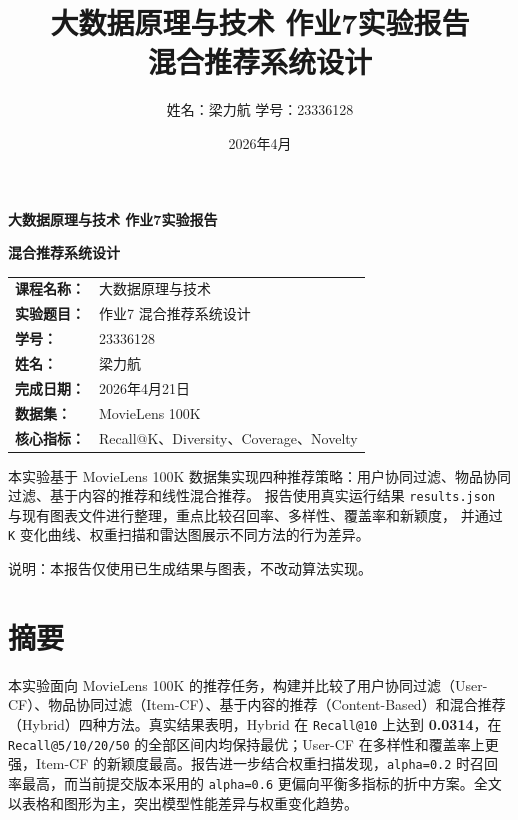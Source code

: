 \documentclass[UTF8,a4paper,12pt,fontset=fandol]{ctexart}
\title{\heiti 大数据原理与技术 作业7实验报告\\混合推荐系统设计}
\author{姓名：梁力航 \quad 学号：23336128}
\date{2026年4月}
\begin{document}
\begin{titlepage}
    \centering
    {\bfseries 大数据原理与技术 作业7实验报告\par}
    \vspace{0.6em}
    {\bfseries 混合推荐系统设计\par}
    \vspace{2.2em}

    \begin{tabularx}{0.92\textwidth}{>{\bfseries}p{4cm}X}
        课程名称： & 大数据原理与技术 \\
        实验题目： & 作业7 混合推荐系统设计 \\
        学号： & 23336128 \\
        姓名： & 梁力航 \\
        完成日期： & 2026年4月21日 \\
        数据集： & MovieLens 100K \\
        核心指标： & Recall@K、Diversity、Coverage、Novelty \\
    \end{tabularx}

    \vspace{1.8em}
    \begin{minipage}{0.92\textwidth}
        \small
        本实验基于 MovieLens 100K 数据集实现四种推荐策略：用户协同过滤、物品协同过滤、基于内容的推荐和线性混合推荐。
        报告使用真实运行结果 \texttt{results.json} 与现有图表文件进行整理，重点比较召回率、多样性、覆盖率和新颖度，
        并通过 \texttt{K} 变化曲线、权重扫描和雷达图展示不同方法的行为差异。
    \end{minipage}

    \vfill
    {\small 说明：本报告仅使用已生成结果与图表，不改动算法实现。}
\end{titlepage}

\section*{摘要}
本实验面向 MovieLens 100K 的推荐任务，构建并比较了用户协同过滤（User-CF）、物品协同过滤（Item-CF）、基于内容的推荐（Content-Based）和混合推荐（Hybrid）四种方法。真实结果表明，Hybrid 在 \texttt{Recall@10} 上达到 \textbf{0.0314}，在 \texttt{Recall@5/10/20/50} 的全部区间内均保持最优；User-CF 在多样性和覆盖率上更强，Item-CF 的新颖度最高。报告进一步结合权重扫描发现，\texttt{alpha=0.2} 时召回率最高，而当前提交版本采用的 \texttt{alpha=0.6} 更偏向平衡多指标的折中方案。全文以表格和图形为主，突出模型性能差异与权重变化趋势。
\end{document}

